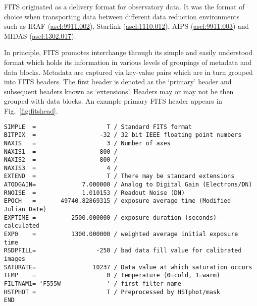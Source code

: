 \documentclass[final,authoryear,5p,times,twocolumn]{elsarticle}
\begin{document}
{{FITS originated as a delivery format for observatory data. It was the format
of choice when transporting data between different data reduction
environments such as IRAF (\href{http://ascl.net/9911.002}{ascl:9911.002}),
Starlink (\href{http://ascl.net/1110.012}{ascl:1110.012}), AIPS
(\href{http://ascl.net/9911.003}{ascl:9911.003}) and MIDAS
(\href{http://ascl.net/1302.017}{ascl:1302.017}).


In principle, FITS promotes interchange through its simple and easily
understood format which holds its information in various levels of groupings
of metadata and data blocks. Metadata are captured via key-value pairs which
are in turn grouped into FITS headers. The first header is denoted as the
`primary' header and subsequent headers known as `extensions'. Headers may or
may not be then grouped with data blocks.  An example primary FITS header
appears in Fig.~\ref{fig:fitshead}.


\begin{figure*}
\begin{minipage}{\textwidth}
\begin{lstlisting}
SIMPLE  =                    T / Standard FITS format
BITPIX  =                  -32 / 32 bit IEEE floating point numbers
NAXIS   =                    3 / Number of axes
NAXIS1  =                  800 /
NAXIS2  =                  800 /
NAXIS3  =                    4 /
EXTEND  =                    T / There may be standard extensions
ATODGAIN=             7.000000 / Analog to Digital Gain (Electrons/DN)
RNOISE  =             1.010153 / Readout Noise (DN)
EPOCH   =       49740.82869315 / exposure average time (Modified Julian Date)
EXPTIME =          2500.000000 / exposure duration (seconds)--calculated
EXP0    =          1300.000000 / weighted average initial exposure time
RSDPFILL=                 -250 / bad data fill value for calibrated images
SATURATE=                10237 / Data value at which saturation occurs
TEMP    =                    0 / Temperature (0=cold, 1=warm)
FILTNAM1= 'F555W             ' / first filter name
HSTPHOT =                    T / Preprocessed by HSTphot/mask
END
\end{lstlisting}
\caption{Representative simple primary header of a FITS file showing
  an assortment of FITS keywords and their associated values. This
  header from 1995 uses a definition of the, now deprecated,
  \texttt{EPOCH} keyword that is at odds with the standard usage of
  the period but the lack of parsable units for the field make it
  hard for a computer parser to understand this.
  Bytes which contain data may or may not follow the \texttt{END} keyword of
  the header.}
\label{fig:fitshead}
\end{minipage}
\end{figure*}


}}
\end{document}
